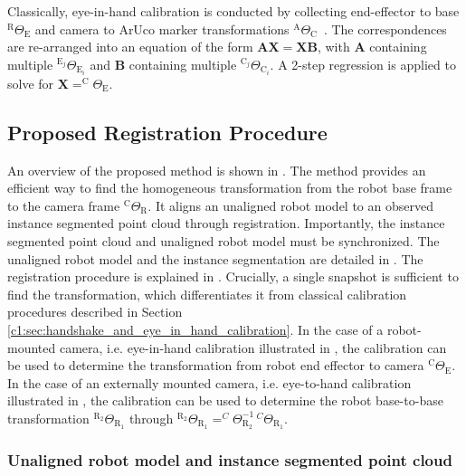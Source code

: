 Classically, eye-in-hand calibration is conducted by collecting end-effector to base $^\text{R}\Theta_\text{E}$ and camera to ArUco marker transformations $^\text{A}\Theta_\text{C}$~\citep{eye_in_hand}. The correspondences are re-arranged into an equation of the form $\mathbf{A}\mathbf{X}=\mathbf{X}\mathbf{B}$, with $\mathbf{A}$ containing multiple $^{\text{E}_j}\Theta_{\text{E}_i}$ and $\mathbf{B}$ containing multiple $^{\text{C}_j}\Theta_{\text{C}_i}$. A 2-step regression is applied to solve for $\mathbf{X}=^\text{C}\Theta_\text{E}$.

\subsection{Proposed Registration Procedure}
\label{c1:sec:proposed_calibration_procedure}
An overview of the proposed method is shown in . The method provides an efficient way to find the homogeneous transformation from the robot base frame to the camera frame $^\text{C}\Theta_\text{R}$. It aligns an unaligned robot model to an observed instance segmented point cloud through registration. Importantly, the instance segmented point cloud and unaligned robot model must be synchronized. The unaligned robot model and the instance segmentation are detailed in . The registration procedure is explained in . Crucially, a single snapshot is sufficient to find the transformation, which differentiates it from classical calibration procedures described in Section \ref{c1:sec:handshake_and_eye_in_hand_calibration}. In the case of a robot-mounted camera, i.e. eye-in-hand calibration illustrated in , the calibration can be used to determine the transformation from robot end effector to camera $^\text{C}\Theta_\text{E}$. In the case of an externally mounted camera, i.e. eye-to-hand calibration illustrated in , the calibration can be used to determine the robot base-to-base transformation $^{\text{R}_2}\Theta_{\text{R}_1}$ through $^{\text{R}_2}\Theta_{\text{R}_1} = ^C\Theta^{-1}_{\text{R}_2}\,^{C}\Theta_{\text{R}_1}$.

\subsubsection{Unaligned robot model and instance segmented point cloud}
\label{c1:sec:unaligned_robot_model_and_instance_segmented_point_cloud}
